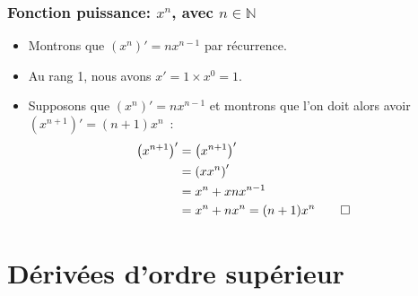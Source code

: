 \documentclass[10pt,notheorems]{beamer}
\theoremstyle{plain}
\theoremstyle{definition} %
\begin{document}
\begin{frame}
  \frametitle{Fonction puissance: $x^n$, avec $n\in\mathbb N$}

  \begin{itemize}

  \item Montrons que $\left(x^n\right)' = nx^{n-1}$ par récurrence.\newline

  \item Au rang 1, nous avons $x' = 1\times x^0 = 1$.\newline

  \item Supposons que $\left(x^n\right)' = nx^{n-1}$ et montrons que l'on doit alors avoir $\left(x^{n+1}\right)' = (n+1)x^{n}$~:
    \[
      \begin{split}
        \left(x^{n+1}\right)' &= \left(x^{n+1}\right)'\\
        &=\left(xx^{n}\right)'\\
        &=x^n + x n x^{n-1}\\
        &=x^n + n x^{n} = (n+1)x^{n}\qed
      \end{split}
    \]

  \end{itemize}
\end{frame}


\section{Dérivées d'ordre supérieur}
\end{document}
